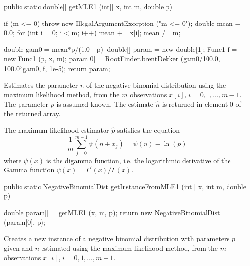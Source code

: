 \begin{code}

   public static double[] getMLE1 (int[] x, int m, double p)\begin{hide} {
      if (m <= 0)
         throw new IllegalArgumentException ("m <= 0");
      double mean = 0.0;
      for (int i = 0; i < m; i++)
         mean += x[i];
      mean /= m;

      double gam0 = mean*p/(1.0 - p);
      double[] param = new double[1];
      Func1 f = new Func1 (p, x, m);
      param[0] = RootFinder.brentDekker (gam0/100.0, 100.0*gam0, f, 1e-5);
      return param;
   }\end{hide}
\end{code}
\begin{tabb}
   Estimates the parameter $n$ of the negative binomial distribution
   using the maximum likelihood method, from the $m$ observations
   $x[i]$, $i = 0, 1, \ldots, m-1$. The parameter $p$ is assumed known.
   The estimate $\hat{n}$ is returned in element 0 of the returned array.
\begin{detailed}
   The maximum likelihood estimator $\hat{p}$ satisfies the equation
 \[
  \frac1m\sum_{j=0}^{m-1} \psi(n +x_j) = \psi(n) - \ln(p)
 \]
   where $\psi(x)$ is the digamma function, i.e. the logarithmic derivative
  of the Gamma function $\psi(x) = \Gamma^\prime(x)/\Gamma(x)$.
 \end{detailed}
\end{tabb}
\begin{htmlonly}
\end{htmlonly}
\begin{code}

   public static NegativeBinomialDist getInstanceFromMLE1 (int[] x, int m,
                                                           double p)\begin{hide} {
      double param[] = getMLE1 (x, m, p);
      return new NegativeBinomialDist (param[0], p);
   }\end{hide}
\end{code}
\begin{tabb}
   Creates a new instance of a negative binomial distribution with parameters
  $p$ given and $\hat{n}$ estimated using the maximum
   likelihood method, from the $m$ observations $x[i]$,
   $i = 0, 1, \ldots, m-1$.
\end{tabb}
